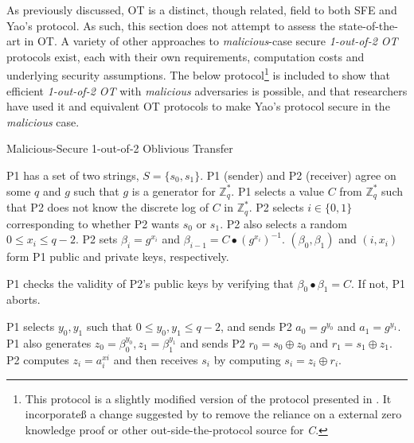 As previously discussed, \ac{OT} is a distinct, though related, field to both \ac{SFE} and Yao's protocol.  As such, this section does not attempt to assess the state-of-the-art in \ac{OT}.  A variety of other approaches to \emph{malicious}-case secure \emph{1-out-of-2 \ac{OT}} protocols exist\cite{naor2001efficient, kiraz2006protocol, goldreich1987play, naor2005computationally}, each with their own requirements, computation costs and underlying security assumptions.  The below protocol\cite{bellare1990non}\footnote{This protocol is a slightly modified version of the protocol presented in \cite{bellare1990non}.  It incorporateß a change suggested by \cite{naor2001efficient} to remove the reliance on a external zero knowledge proof or other out-side-the-protocol source for \emph{C}.} is included to show that efficient \emph{1-out-of-2 \ac{OT}} with \emph{malicious} adversaries is possible, and that researchers have used it and equivalent \ac{OT} protocols to make Yao's protocol secure in the \emph{malicious} case.

\begin{algorithm}[H]
    \caption{Malicious-Secure 1-out-of-2 Oblivious Transfer}
    \label{alg:otmalicious}
    \begin{algorithmic}[1]
        \STATE \ac{P1} has a set of two strings, $S = \{s_0, s_1\}$.
        \STATE \ac{P1} (sender) and \ac{P2} (receiver) agree on some $q$ and $g$ such that $g$ is a generator for $\mathbb{Z}^*_q$.
        \STATE \ac{P1} selects a value  $C$ from $\mathbb{Z}^*_q$ such that \ac{P2} does not know the discrete log of $C$ in $\mathbb{Z}^*_q$.
        \STATE \ac{P2} selects $i \in \{0, 1\}$ corresponding to whether \ac{P2} wants $s_0$ or $s_1$. \ac{P2} also selects a random $0 \leq x_i \leq q-2$.
        \STATE \ac{P2} sets $\beta_i = g^{x_i}$ and $\beta_{i-1} = C \bullet (g^{x_i})^{-1}$. $(\beta_0, \beta_1)$ and $(i, x_i)$ form \ac{P1} public and private keys, respectively.

        \STATE \ac{P1} checks the validity of \ac{P2}'s public keys by verifying that $\beta_0 \bullet \beta_1 = C$.  If not, \ac{P1} aborts.

        \STATE \ac{P1} selects $y_0, y_1$ such that $0 \leq y_0, y_1 \leq q-2$, and sends \ac{P2} $a_0 = g^{y_0}$ and $a_1 = g^{y_1}$.
        \STATE \ac{P1} also generates $z_0 = \beta^{y_0}_0, z_1 = \beta^{y_1}_1$ and sends \ac{P2} $r_0 = s_0 \oplus z_0$ and $r_1 = s_1 \oplus z_1$.
        \STATE \ac{P2} computes $z_i = a^{xi}_i$ and then receives $s_i$ by computing $s_i = z_i \oplus r_i$.
    \end{algorithmic}
\end{algorithm}

